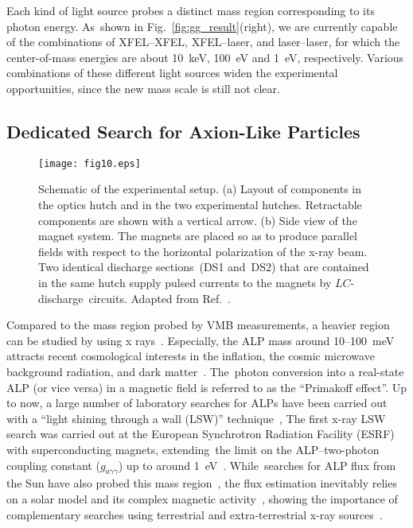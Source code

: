 \documentclass[10pt,a4paper]{article}%
\begin{document}
Each kind of light source probes a distinct mass region corresponding to its photon energy.
As~shown in Fig.~\ref{fig:gg_result}(right), we are currently capable of the combinations of XFEL--XFEL, XFEL--laser, and laser--laser, for which the center-of-mass energies are about 10~keV, 100~eV and 1~eV, respectively.
Various combinations of these different light sources widen the experimental opportunities, since the new mass scale is still not clear.

\subsection{Dedicated Search for Axion-Like Particles}\label{subsec:alp}

\begin{figure}[!t]
\centering
\texttt{[image: fig10.eps]}
\caption{
Schematic of the experimental setup.
(a) Layout of components in the optics hutch and in the two experimental hutches.
Retractable components are shown with a vertical arrow.
(b) Side view of the magnet system.
The magnets are placed so as to produce parallel fields with respect to the horizontal polarization of the x-ray beam.
Two identical discharge sections~(DS1 and~DS2) that are contained in the same hutch supply pulsed currents to the magnets by $LC$-discharge~circuits.
Adapted from Ref.~\cite{spring-8}.
\label{fig:lsw_setup}}
\end{figure}   

Compared to the mass region probed by VMB measurements, a heavier region can be studied by using x rays~\cite{paraphoton,spring-8}.
Especially, the ALP mass around 10--100~meV attracts recent cosmological interests in the inflation, the cosmic microwave background radiation, and dark matter~\cite{takahashi}.
The~photon conversion into a real-state ALP (or vice versa) in a magnetic field is referred to as the ``Primakoff effect''.
Up to now, a large number of laboratory searches for ALPs have been carried out with a ``light shining through a wall (LSW)'' technique~\cite{axion_review},
The first x-ray LSW search was carried out at the European Synchrotron Radiation Facility (ESRF) with superconducting magnets, extending~the limit on the ALP--two-photon coupling constant ($g_{a\gamma\gamma}$) up to around 1~eV~\cite{esrf}.
While~searches for ALP flux from the Sun have also probed this mass region~\cite{cast},
the flux estimation inevitably relies on a solar model and its complex magnetic activity~\cite{solar_mag}, showing the importance of complementary searches using terrestrial and extra-terrestrial x-ray sources~\cite{esrf}.
\end{document}
